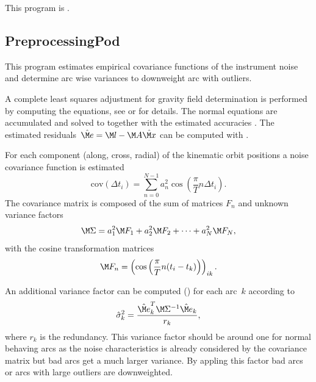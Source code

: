 This program is .
\clearpage
\subsection{PreprocessingPod}\label{PreprocessingPod}
This program estimates empirical covariance functions of the instrument noise and determine arc wise variances to
downweight arc with outliers.

A complete least squares adjustment for gravity field determination is performed by computing the 
equations, see  or
 for details. The normal equations
are accumulated and solved to  together with the estimated accuracies
. The estimated residuals~$\hat{\M e}=\M l-\M A\hat{\M x}$ can be computed with
.

For each component (along, cross, radial) of the kinematic orbit positions a noise covariance function is estimated
\begin{equation}
  \text{cov}(\Delta t_i) = \sum_{n=0}^{N-1} a_n^2 \cos\left(\frac{\pi}{T} n\Delta t_i\right).
\end{equation}
The covariance matrix is composed of the sum of matrices $F_n$ and unknown variance factors
\begin{equation}
  \M\Sigma = a_1^2\M F_1 + a_2^2 \M F_2 + \cdots + a_N^2\M F_N,
\end{equation}
with the cosine transformation matrices
\begin{equation}
  \M F_n = \left(\cos\left(\frac{\pi}{T} n(t_i-t_k)\right)\right)_{ik}.
\end{equation}

An additional variance factor can be computed () for each arc~$k$  according to
\begin{equation}
  \hat{\sigma}_k^2 = \frac{\hat{\M e}_k^T\M\Sigma^{-1}\hat{\M e}_k}{r_k},
\end{equation}
where $r_k$ is the redundancy. This variance factor should be around one for normal behaving arcs
as the noise characteristics is already considered by the covariance matrix but bad arcs get a much larger variance.
By appling this factor bad arcs or arcs with large outliers are downweighted.


